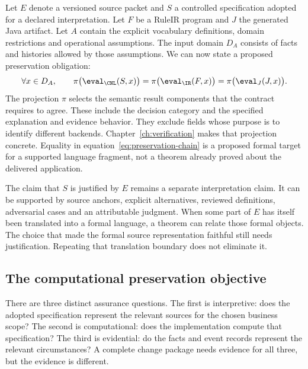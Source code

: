 
Let $E$ denote a versioned source packet and $S$ a controlled specification
adopted for a declared interpretation. Let $F$ be a RuleIR program and $J$ the
generated Java artifact. Let $A$ contain the explicit vocabulary definitions,
domain restrictions and operational assumptions. The input domain $D_A$ consists
of facts and histories allowed by those assumptions. We can now state a proposed
preservation obligation:
\begin{equation}
 \forall x\in D_A,\qquad
 \pi\bigl(\eval_{\CNL}(S,x)\bigr)
 =\pi\bigl(\eval_{\IR}(F,x)\bigr)
 =\pi\bigl(\eval_{J}(J,x)\bigr).
 \label{eq:preservation-chain}
\end{equation}
The projection $\pi$ selects the semantic result components that the contract
requires to agree. These include the decision category and the specified
explanation and evidence behavior. They exclude fields whose purpose is to
identify different backends. Chapter~\ref{ch:verification} makes that projection
concrete. Equality in equation~\eqref{eq:preservation-chain} is a proposed formal
target for a supported language fragment, not a theorem already proved about
the delivered application.

The claim that $S$ is justified by $E$ remains a separate interpretation claim.
It can be supported by source anchors, explicit alternatives, reviewed
definitions, adversarial cases and an attributable judgment. When some part of
$E$ has itself been translated into a formal language, a theorem can relate
those formal objects. The choice that made the formal source representation
faithful still needs justification. Repeating that translation boundary does not
eliminate it.

\subsection{The computational preservation objective}
\label{merge:P-03-product:05}

\label{sec:proof}

There are three distinct assurance questions. The first is interpretive: does the
adopted specification represent the relevant sources for the chosen business
scope? The second is computational: does the implementation compute that
specification? The third is evidential: do the facts and event records represent
the relevant circumstances? A complete change package needs evidence for all
three, but the evidence is different.


